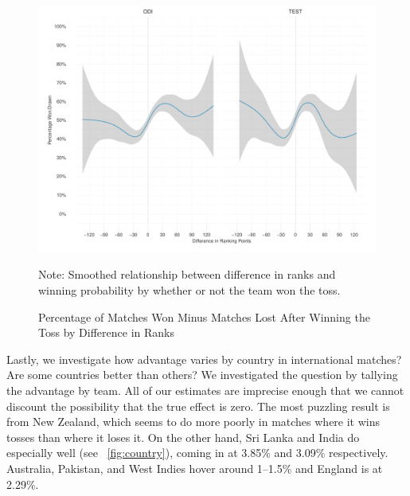 \documentclass[12pt]{article}
\begin{document}
\begin{figure}[htbp]
\centering
\caption{Percentage of Matches Won Minus Matches Lost After Winning the Toss by Difference in Ranks}
\includegraphics[width=1\textwidth]{../figs/winbyRank.pdf}
{\footnotesize Note: Smoothed relationship between difference in ranks and winning probability by whether or not the team won the toss.\par}
\label{fig:ranks}
\end{figure}

Lastly, we investigate how advantage varies by country in international matches? Are some countries better than others? We investigated the question by tallying the advantage by team. All of our estimates are imprecise enough that we cannot discount the possibility that the true effect is zero. The most puzzling result is from New Zealand, which seems to do more poorly in matches where it wins tosses than where it loses it. On the other hand, Sri Lanka and India do especially well (see ~\ref{fig:country}), coming in at 3.85\% and 3.09\% respectively. Australia, Pakistan, and West Indies hover around 1--1.5\% and England is at 2.29\%. 
\end{document}

